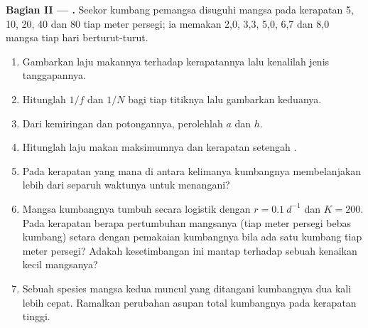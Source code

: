 \begin{problem}
\medskip
\noindent\textbf{Bagian II --- .}
Seekor kumbang pemangsa disuguhi mangsa pada kerapatan 5, 10, 20, 40
dan 80 tiap meter persegi; ia memakan 2,0, 3,3, 5,0, 6,7 dan 8,0
mangsa tiap hari berturut-turut.
\begin{enumerate}[resume]
  \item Gambarkan laju makannya terhadap kerapatannya lalu kenalilah
        jenis tanggapannya.
  \item Hitunglah $1/f$ dan $1/N$ bagi tiap titiknya lalu gambarkan
        keduanya.
  \item Dari kemiringan dan potongannya, perolehlah $a$ dan $h$.
  \item Hitunglah laju makan maksimumnya dan kerapatan setengah
        .
  \item Pada kerapatan yang mana di antara kelimanya kumbangnya
        membelanjakan lebih dari separuh waktunya untuk menangani?
  \item Mangsa kumbangnya tumbuh secara logistik dengan $r = \qty{0.1}{d^{-1}}$
        dan $K = 200$. Pada kerapatan berapa pertumbuhan mangsanya
        (tiap meter persegi bebas kumbang) setara dengan pemakaian
        kumbangnya bila ada satu kumbang tiap meter persegi? Adakah
        kesetimbangan ini mantap terhadap sebuah kenaikan kecil
        mangsanya?
  \item Sebuah spesies mangsa kedua muncul yang ditangani kumbangnya
        dua kali lebih cepat. Ramalkan perubahan asupan total
        kumbangnya pada kerapatan tinggi.
\end{enumerate}


\end{problem}
